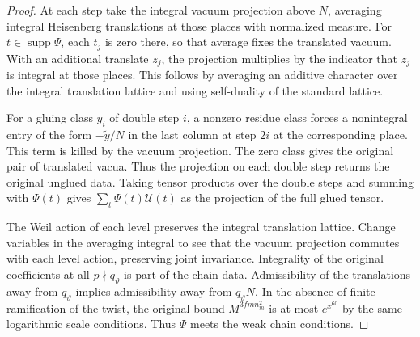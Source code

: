 \begin{proof}
At each step take the integral vacuum projection above $N$, averaging integral Heisenberg translations at those places with normalized measure. For $t\in\operatorname{supp}\Psi$, each $t_j$ is zero there, so that average fixes the translated vacuum. With an additional translate $z_j$, the projection multiplies by the indicator that $z_j$ is integral at those places. This follows by averaging an additive character over the integral translation lattice and using self-duality of the standard lattice.

For a gluing class $y_i$ of double step $i$, a nonzero residue class forces a nonintegral entry of the form $-\widetilde y/N$ in the last column at step $2i$ at the corresponding place. This term is killed by the vacuum projection. The zero class gives the original pair of translated vacua. Thus the projection on each double step returns the original unglued data. Taking tensor products over the double steps and summing with $\Psi(t)$ gives $\sum_t\Psi(t)\mathcal U(t)$ as the projection of the full glued tensor.

The Weil action of each level preserves the integral translation lattice. Change variables in the averaging integral to see that the vacuum projection commutes with each level action, preserving joint invariance. Integrality of the original coefficients at all $p\nmid q_\vartheta$ is part of the chain data. Admissibility of the translations away from $q_\vartheta$ implies admissibility away from $q_\vartheta N$. In the absence of finite ramification of the twist, the original bound $M^{3fmn_m^2}$ is at most $e^{x^{60}}$ by the same logarithmic scale conditions. Thus $\Psi$ meets the weak chain conditions.
\end{proof}

